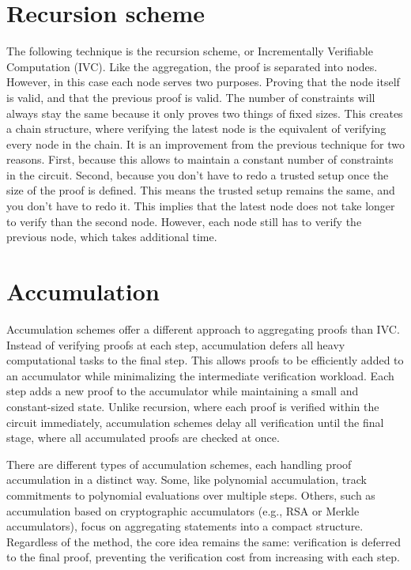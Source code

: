 \section{Recursion scheme}
The following technique is the recursion scheme, or Incrementally Verifiable Computation (IVC). Like the aggregation, the proof is separated into nodes.
However, in this case each node serves two purposes. Proving that the node itself is valid, and that the previous proof is valid.
The number of constraints will always stay the same because it only proves two things of fixed sizes. This creates
a chain structure, where verifying the latest node is the equivalent of verifying every node in the chain.
It is an improvement from the previous technique for two reasons.
First, because this allows to maintain a constant number of constraints in the circuit.
Second, because you don't have to redo a trusted setup once the size of the proof is defined.
This means the trusted setup remains the same, and you don't have to redo it.
This implies that the latest node does not take longer to verify than the second node.
However, each node still has to verify the previous node, which takes additional time. \cite{Nova23}


\section{Accumulation}
Accumulation schemes offer a different approach to aggregating proofs than IVC. 
Instead of verifying proofs at each step, accumulation defers all heavy computational tasks to the final step.
This allows proofs to be efficiently added to an accumulator while minimalizing the intermediate verification workload. 
Each step adds a new proof to the accumulator while maintaining a small and constant-sized state. 
Unlike recursion, where each proof is verified within the circuit immediately, accumulation schemes delay all verification until the final stage, 
where all accumulated proofs are checked at once.

There are different types of accumulation schemes, each handling proof accumulation in a distinct way.
Some, like polynomial accumulation, track commitments to polynomial evaluations over multiple steps. 
Others, such as accumulation based on cryptographic accumulators (e.g., RSA or Merkle accumulators), focus on aggregating statements into a compact structure. 
Regardless of the method, the core idea remains the same: verification is deferred to the final proof, preventing the verification cost from increasing with each step.

